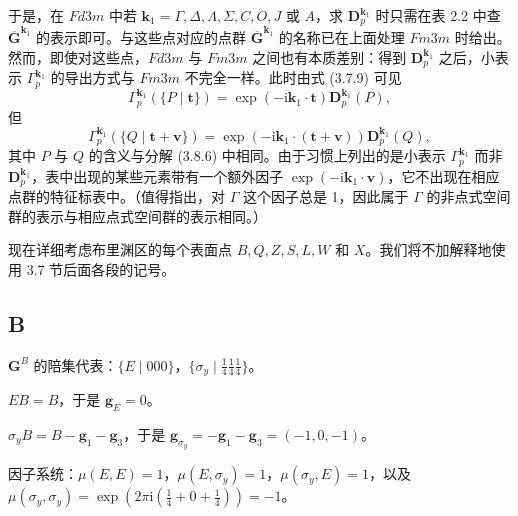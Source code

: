 于是，在 $Fd3m$ 中若 $\mathbf{k}_{1} = \Gamma, \Delta, \Lambda, \Sigma, C, O, J$ 或 $A$，求 $\mathbf{D}^{\mathbf{k}_{1}}_{p}$ 时只需在表 2.2 中查 $\overline{\mathbf{G}}^{\mathbf{k}_{1}}$ 的表示即可。与这些点对应的点群 $\overline{\mathbf{G}}^{\mathbf{k}_{1}}$ 的名称已在上面处理 $Fm3m$ 时给出。然而，即使对这些点，$Fd3m$ 与 $Fm3m$ 之间也有本质差别：得到 $\mathbf{D}^{\mathbf{k}_{1}}_{p}$ 之后，小表示 $\Gamma^{\mathbf{k}_{1}}_{p}$ 的导出方式与 $Fm3m$ 不完全一样。此时由式 (3.7.9) 可见
\begin{equation*}
\Gamma^{\mathbf{k}_{1}}_{p}(\{P \mid \mathbf{t}\}) = \exp(-\mathrm{i}\mathbf{k}_{1} \cdot \mathbf{t})\mathbf{D}^{\mathbf{k}_{1}}_{p}(P),
\tag{3.8.8}
\end{equation*}
但
\begin{equation*}
\Gamma^{\mathbf{k}_{1}}_{p}(\{Q \mid \mathbf{t} + \mathbf{v}\}) = \exp\left(-\mathrm{i}\mathbf{k}_{1} \cdot (\mathbf{t} + \mathbf{v})\right)\mathbf{D}^{\mathbf{k}_{1}}_{p}(Q),
\tag{3.8.9}
\end{equation*}
其中 $P$ 与 $Q$ 的含义与分解 (3.8.6) 中相同。由于习惯上列出的是小表示 $\Gamma^{\mathbf{k}_{1}}_{p}$ 而非 $\mathbf{D}^{\mathbf{k}_{1}}_{p}$，表中出现的某些元素带有一个额外因子 $\exp(-\mathrm{i}\mathbf{k}_{1} \cdot \mathbf{v})$，它不出现在相应点群的特征标表中。（值得指出，对 $\Gamma$ 这个因子总是 1，因此属于 $\Gamma$ 的非点式空间群的表示与相应点式空间群的表示相同。）

现在详细考虑布里渊区的每个表面点 $B, Q, Z, S, L, W$ 和 $X$。我们将不加解释地使用 3.7 节后面各段的记号。

\subsection*{B}

$\mathbf{G}^{B}$ 的陪集代表：$\{E \mid 000\}$，$\{\sigma_{y} \mid {\frac{1}{4}}{\frac{1}{4}}{\frac{1}{4}}\}$。

\begin{center}
$EB = B$，于是 $\mathbf{g}_{E} = 0$。

$\sigma_{y}B = B - \mathbf{g}_{1} - \mathbf{g}_{3}$，于是 $\mathbf{g}_{\sigma_{y}} = -\mathbf{g}_{1} - \mathbf{g}_{3} = (-1, 0, -1)$。
\end{center}

因子系统：$\mu(E, E) = 1$，$\mu(E, \sigma_{y}) = 1$，$\mu(\sigma_{y}, E) = 1$，以及 $\mu(\sigma_{y}, \sigma_{y}) = \exp\left(2\pi\mathrm{i}\left(\frac{1}{4} + 0 + \frac{1}{4}\right)\right) = -1$。

